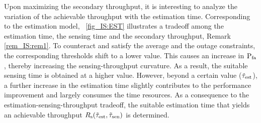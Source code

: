 {Upon maximizing the secondary throughput, it is interesting to analyze the variation of the achievable throughput with the estimation time. Corresponding to the estimation model, \figurename~\ref{fig_IS:EST} illustrates a tradeoff among the estimation time, the sensing time and the secondary throughput,  Remark \ref{rem_IS:rem1}.  To counteract and satisfy the average and the outage constraints, the corresponding thresholds shift to a lower value. This causes an increase in $\text{P}_{\text{fa}}$, thereby increasing the sensing-throughput curvature. As a result, the suitable sensing time is obtained at a higher value. However, beyond a certain value ($\tilde{\tau}_{\text{est}}$), a further increase in the estimation time slightly contributes to the performance improvement and largely consumes the time resources. As a consequence to the estimation-sensing-throughput tradeoff, the suitable estimation time that yields an achievable throughput $R_{\text{s}}(\tilde{\tau}_{\text{est}},\tilde{\tau}_{\text{sen}})$ is determined. 

\begin{figure}[!ht]


\centering
{}
\end{figure}}
